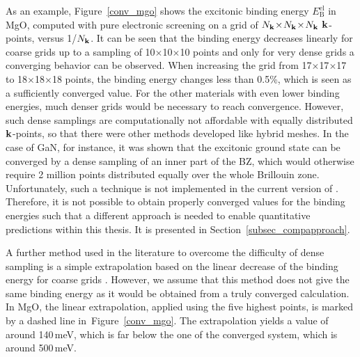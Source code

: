 %
As an example, Figure~\ref{conv_mgo} shows the excitonic binding energy $E^\text{el}_\text{B}$ in MgO, computed with pure electronic screening on a grid of $N_{\mathbf{k}}\!\times\!N_{\mathbf{k}}\!\times\!N_{\mathbf{k}}$ $\mathbf{k}$-points, versus 1/$N_{\mathbf{k}}$. It can be seen that the binding energy decreases linearly for coarse grids up to a sampling of 10$\times$10$\times$10 points and only for very dense grids a converging behavior can be observed. When increasing the grid from 17$\times$17$\times$17  to 18$\times$18$\times$18 points, the binding energy changes less than 0.5\%, which is seen as a sufficiently converged value. For the other materials with even lower binding energies, much denser grids would be necessary to reach convergence. However, such dense samplings  are computationally not affordable  with equally distributed $\mathbf{k}$-points, so that there were other methods developed like hybrid meshes. In the case of GaN, for instance, it was shown that the excitonic ground state can be converged by a dense sampling of an inner part of the BZ, which would otherwise require 2 million points distributed equally over the whole Brillouin zone\cite{draxl_gan}. Unfortunately, such a technique is not implemented in the current version of \exciting{}. Therefore, it is not possible to obtain properly converged values for the binding energies such that a different approach is needed to enable quantitative predictions within this thesis. It is presented in Section~\ref{subsec_compapproach}.\par
A further method used in the literature to overcome the difficulty of dense sampling is a simple extrapolation based on the linear decrease of the binding energy for coarse grids\cite{mgo_wrong_convergence} . However,  we assume that this method does not give the same binding energy as it would be obtained from a truly converged calculation. In MgO, the linear extrapolation, applied using the five highest points, is marked by a dashed line in~Figure~\ref{conv_mgo}. The extrapolation yields a value of around 140\,meV, which is far below the one of the converged system, which is around 500\,meV.
%





